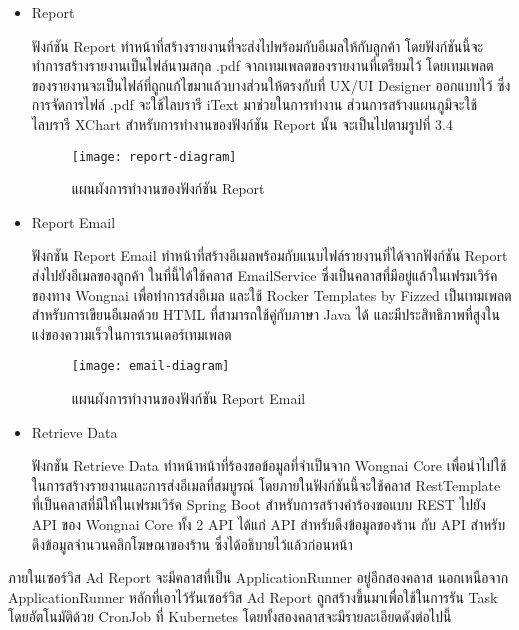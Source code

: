 \begin{enumerate}
\begin{itemize}
		\item Report
		
		ฟังก์ชัน Report ทำหน้าที่สร้างรายงานที่จะส่งไปพร้อมกับอีเมลให้กับลูกค้า โดยฟังก์ชันนี้จะทำการสร้างรายงานเป็นไฟล์นามสกุล .pdf จากเทมเพลตของรายงานที่เตรียมไว้ โดยเทมเพลตของรายงานจะเป็นไฟล์ที่ถูกแก้ไขมาแล้วบางส่วนให้ตรงกับที่ UX/UI Designer ออกแบบไว้ ซึ่งการจัดการไฟล์ .pdf จะใช้ไลบรารี iText มาช่วยในการทำงาน ส่วนการสร้างแผนภูมิจะใช้ไลบรารี XChart สำหรับการทำงานของฟังก์ชัน Report นั้น จะเป็นไปตามรูปที่ 3.4
		
		\begin{figure}[!h]
			\centering
			\texttt{[image: report-diagram]}  
			\caption{แผนผังการทำงานของฟังก์ชัน Report}
			\label{Fig:report-diagram}
		\end{figure}
		
		\item Report Email
		
		ฟังกชัน Report Email ทำหน้าที่สร้างอีเมลพร้อมกับแนบไฟล์รายงานที่ได้จากฟังก์ชัน Report ส่งไปยังอีเมลของลูกค้า ในที่นี้ได้ใช้คลาส EmailService ซึ่งเป็นคลาสที่มีอยู่แล้วในเฟรมเวิร์คของทาง Wongnai เพื่อทำการส่งอีเมล และใช้ Rocker Templates by Fizzed เป็นเทมเพลตสำหรับการเขียนอีเมลด้วย HTML ที่สามารถใช้คู่กับภาษา Java ได้ และมีประสิทธิภาพที่สูงในแง่ของความเร็วในการเรนเดอร์เทมเพลต ~\cite{rocker}
			
		\begin{figure}[!h]
			\centering
			\texttt{[image: email-diagram]}  
			\caption{แผนผังการทำงานของฟังก์ชัน Report Email}
			\label{Fig:email-diagram}
		\end{figure}
			
		\item Retrieve Data
		
		ฟังกชัน Retrieve Data ทำหน้าหน้าที่ร้องขอข้อมูลที่จำเป็นจาก Wongnai Core เพื่อนำไปใช้ในการสร้างรายงานและการส่งอีเมลที่สมบูรณ์ โดยภายในฟังก์ชันนี้จะใช้คลาส RestTemplate ที่เป็นคลาสที่มีให้ในเฟรมเวิร์ค Spring Boot สำหรับการสร้างคำร้องขอแบบ REST ไปยัง API ของ Wongnai Core ทั้ง 2 API ได้แก่ API สำหรับดึงข้อมูลของร้าน กับ API สำหรับดึงข้อมูลจำนวนคลิกโฆษณาของร้าน ซึ่งได้อธิบายไว้แล้วก่อนหน้า
	\end{itemize}

	ภายในเซอร์วิส Ad Report จะมีคลาสที่เป็น ApplicationRunner อยู่อีกสองคลาส นอกเหนือจาก ApplicationRunner หลักที่เอาไว้รันเซอร์วิส Ad Report ถูกสร้างขึ้นมาเพื่อใช้ในการรัน Task โดยอัตโนมัติด้วย CronJob ที่ Kubernetes โดยทั้งสองคลาสจะมีรายละเอียดดังต่อไปนี้


\end{enumerate}
